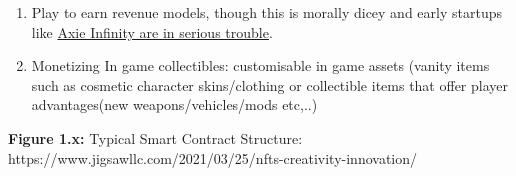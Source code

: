 \begin{enumerate}
\def\labelenumi{\alph{enumi}.}
\setcounter{enumi}{2}
\item
  Play to earn revenue models, though this is morally dicey and early startups like \href{https://www.bloomberg.com/news/features/2022-06-10/axie-infinity-axs-crypto-game-promised-nft-riches-gave-ruin}{Axie Infinity are in serious trouble}.
\item
  Monetizing In game collectibles: customisable in game assets (vanity
  items such as cosmetic character skins/clothing or collectible items
  that offer player advantages(new weapons/vehicles/mods etc,..)
\end{enumerate}

\textbf{Figure 1.x:} Typical Smart Contract Structure:
https://www.jigsawllc.com/2021/03/25/nfts-creativity-innovation/
